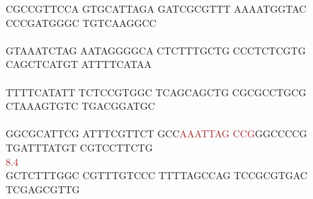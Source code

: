 \documentclass[11pt,twoside,reqno,a4paper]{article}
\begin{document}
{CGCCGTTCCA	GTGCATTAGA	GATCGCGTTT	AAAATGGTAC	CCCGATGGGC	TGTCAAGGCC	\\
\hspace*{1\charwidth}\hspace*{1\charwidth}\hspace*{1\charwidth}\hspace*{1\charwidth}\hspace*{1\charwidth}\hspace*{1\charwidth}\\
GTAAATCTAG	AATAGGGGCA	CTCTTTGCTG	CCCTCTCGTG	CAGCTCATGT	ATTTTCATAA	\\
\hspace*{1\charwidth}\hspace*{1\charwidth}\hspace*{1\charwidth}\hspace*{1\charwidth}\hspace*{1\charwidth}\hspace*{1\charwidth}\\
TTTTCATATT	TCTCCGTGGC	TCAGCAGCTG	CGCGCCTGCG	CTAAAGTGTC	TGACGGATGC	\\
\hspace*{1\charwidth}\hspace*{1\charwidth}\hspace*{1\charwidth}\hspace*{1\charwidth}\hspace*{1\charwidth}\hspace*{1\charwidth}\\
GGCGCATTCG	ATTTCGTTCT	GCC\textcolor{Brown}{A}\textcolor{Brown}{A}\textcolor{Brown}{A}\textcolor{Brown}{T}\textcolor{Brown}{T}\textcolor{Brown}{A}\textcolor{Brown}{G}	\textcolor{Brown}{C}\textcolor{Brown}{C}\textcolor{Brown}{G}GGCCCCG	TGATTTATGT	CGTCCTTCTG	\\
\hspace*{1\charwidth}\hspace*{1\charwidth}\hspace*{23\charwidth}\textcolor{Brown}{8.4}\hspace*{1\charwidth}\hspace*{1\charwidth}\hspace*{1\charwidth}\hspace*{1\charwidth}\\
GCTCTTTGGC	CGTTTGTCCC	TTTTAGCCAG	TCCGCGTGAC	TCGAGCGTTG	\\
\hspace*{1\charwidth}\hspace*{1\charwidth}\hspace*{1\charwidth}\hspace*{1\charwidth}\hspace*{1\charwidth}\\
\\
\\
}
\\
\end{document}
